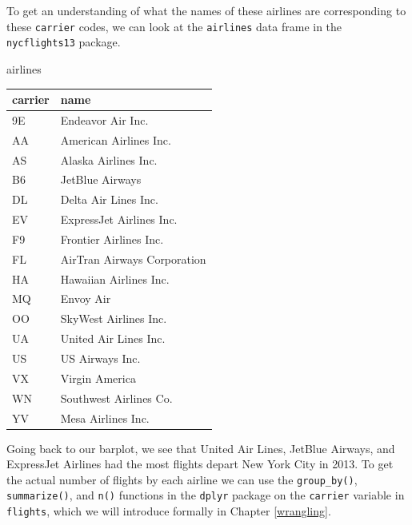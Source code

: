 \documentclass[12pt,]{krantz}
\makeatletter
\newenvironment{Shaded}{\begin{snugshade}}{\end{snugshade}}
\newcommand{\NormalTok}[1]{#1}
\newenvironment{kframe}{%
\medskip{}
\setlength{\fboxsep}{.8em}
 \def\at@end@of@kframe{}%
 \ifinner\ifhmode%
  \def\at@end@of@kframe{\end{minipage}}%
  \begin{minipage}{\columnwidth}%
 \fi\fi%
 \def\FrameCommand##1{\hskip\@totalleftmargin \hskip-\fboxsep
 \colorbox{shadecolor}{##1}\hskip-\fboxsep
     \hskip-\linewidth \hskip-\@totalleftmargin \hskip\columnwidth}%
 \MakeFramed {\advance\hsize-\width
   \@totalleftmargin\z@ \linewidth\hsize
   \@setminipage}}%
 {\par\unskip\endMakeFramed%
 \at@end@of@kframe}
\renewenvironment{Shaded}{\begin{kframe}}{\end{kframe}}
\theoremstyle{definition}
\theoremstyle{definition}
\theoremstyle{definition}
\theoremstyle{remark}
\makeatother
\begin{document}
To get an understanding of what the names of these airlines are
corresponding to these \texttt{carrier} codes, we can look at the
\texttt{airlines} data frame in the \texttt{nycflights13} package.

\begin{Shaded}
\begin{Highlighting}[]
\NormalTok{airlines}
\end{Highlighting}
\end{Shaded}

\begin{table}[H]
\centering\begingroup\fontsize{10}{12}\selectfont

\begin{tabular}{l|l}
\hline
carrier & name\\
\hline
9E & Endeavor Air Inc.\\
\hline
AA & American Airlines Inc.\\
\hline
AS & Alaska Airlines Inc.\\
\hline
B6 & JetBlue Airways\\
\hline
DL & Delta Air Lines Inc.\\
\hline
EV & ExpressJet Airlines Inc.\\
\hline
F9 & Frontier Airlines Inc.\\
\hline
FL & AirTran Airways Corporation\\
\hline
HA & Hawaiian Airlines Inc.\\
\hline
MQ & Envoy Air\\
\hline
OO & SkyWest Airlines Inc.\\
\hline
UA & United Air Lines Inc.\\
\hline
US & US Airways Inc.\\
\hline
VX & Virgin America\\
\hline
WN & Southwest Airlines Co.\\
\hline
YV & Mesa Airlines Inc.\\
\hline
\end{tabular}
\endgroup{}
\end{table}

Going back to our barplot, we see that United Air Lines, JetBlue
Airways, and ExpressJet Airlines had the most flights depart New York
City in 2013. To get the actual number of flights by each airline we can
use the \texttt{group\_by()}, \texttt{summarize()}, and \texttt{n()}
functions in the \texttt{dplyr} package on the \texttt{carrier} variable
in \texttt{flights}, which we will introduce formally in Chapter
\ref{wrangling}.
\end{document}

